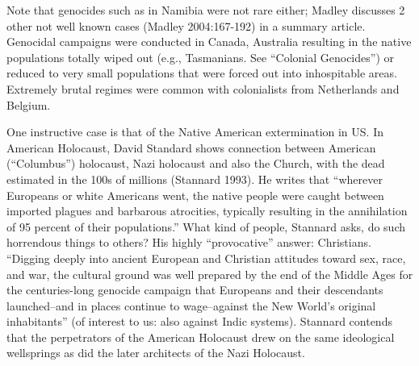 Note that genocides such as in Namibia were not rare either; Madley discusses 2 other not well known cases (Madley 2004:167-192) in a summary article. Genocidal campaigns were conducted in Canada, Australia resulting in the native populations totally wiped out (e.g., Tasmanians. See “Colonial Genocides”) or reduced to very small populations that were forced out into inhospitable areas.  Extremely brutal regimes were common with colonialists from Netherlands and Belgium.

One instructive case is that of the Native American extermination in US.  In American Holocaust, David Standard shows connection between American (“Columbus”) holocaust, Nazi holocaust and also the Church, with the dead estimated in the 100s of millions (Stannard 1993). He writes that “wherever Europeans or white Americans went, the native people were caught between imported plagues and barbarous atrocities, typically resulting in the annihilation of 95 percent of their populations.” What kind of people, Stannard asks, do such horrendous things to others? His highly “provocative” answer: Christians. “Digging deeply into ancient European and Christian attitudes toward sex, race, and war, the cultural ground was well prepared by the end of the Middle Ages for the centuries-long genocide campaign that Europeans and their descendants launched--and in places continue to wage--against the New World's original inhabitants” (of interest to us: also against Indic systems). Stannard contends that the perpetrators of the American Holocaust drew on the same ideological wellsprings as did the later architects of the Nazi Holocaust.

